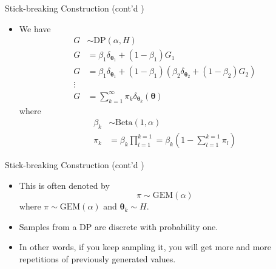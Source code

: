 \documentclass[10pt,mathserif]{beamer}
\begin{document}
\begin{frame}{Stick-breaking Construction (cont'd )}
\begin{itemize}
    \item We have
    \begin{equation*}
        \begin{split}
            G & \sim \text{DP}(\alpha, H)\\
            G & = \beta_1\delta_{\bm{\theta}_1} + (1-\beta_1)G_1\\ 
            G & = \beta_1\delta_{\bm{\theta}_1} + (1-\beta_1)(\beta_2\delta_{\bm{\theta}_2} + (1-\beta_2)G_2)\\
            \vdots & \\
            G & = \sum_{k= 1}^\infty \pi_k\delta_{\bm{\theta}_k} (\bm{\theta})
        \end{split}
    \end{equation*}
    where 
    \begin{equation*}
        \begin{split}
        \beta_k & \sim \text{Beta}(1,\alpha)\\
        \pi_k  & = \beta_k\prod_{l=1}^{k=1} = \beta_k(1-\sum_{l=1}^{k=1}\pi_l)
        \end{split}
    \end{equation*}
\end{itemize}    
\end{frame}

\begin{frame}{Stick-breaking Construction (cont'd )}
\begin{itemize}
    \item This is often denoted by
        \begin{equation*}
            \pi\sim \text{GEM}(\alpha)
        \end{equation*}
        where $\pi \sim \text{GEM}(\alpha)$ and $\bm{\theta}_k \sim H$. 
    \item Samples from a DP are discrete with probability one. 
    \item In other words, if you keep sampling it, you will get more and more repetitions of previously generated values. 
\end{itemize}    
\end{frame}
\end{document}
